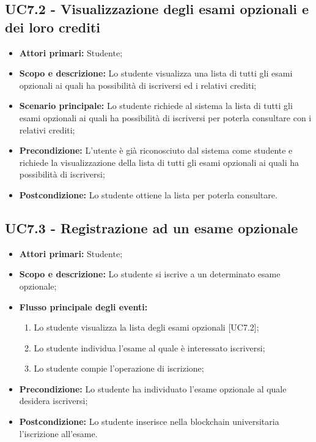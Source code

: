 \documentclass[AnalisiDeiRequisiti.tex]{subfiles}
\begin{document}
\subsection{UC7.2 - Visualizzazione degli esami opzionali e dei loro crediti}
\begin{itemize}
	\item \textbf{Attori primari:} Studente;\\
	\item \textbf{Scopo e descrizione:} Lo studente visualizza una lista di tutti gli esami opzionali ai quali ha possibilità di iscriversi ed i relativi crediti;\\
	\item \textbf{Scenario principale:} Lo studente richiede al sistema la lista di tutti gli esami opzionali ai quali ha possibilità di iscriversi per poterla consultare con i relativi crediti;\\
	\item \textbf{Precondizione:} L'utente è già riconosciuto dal sistema come studente e richiede la visualizzazione della lista di tutti gli esami opzionali ai quali ha possibilità di iscriversi;\\
	\item \textbf{Postcondizione:} Lo studente ottiene la lista per poterla consultare.\\
\end{itemize}

\subsection{UC7.3 - Registrazione ad un esame opzionale}
\begin{itemize}
	\item \textbf{Attori primari:} Studente;\\
	\item \textbf{Scopo e descrizione:} Lo studente si iscrive a un determinato esame opzionale;\\
	\item \textbf{Flusso principale degli eventi:}\\
	\begin{enumerate}
		\item Lo studente visualizza la lista degli esami opzionali [UC7.2];
		\item Lo studente individua l'esame al quale è interessato iscriversi;
		\item Lo studente compie l'operazione di iscrizione;
	\end{enumerate}
	\item \textbf{Precondizione:} Lo studente ha individuato l'esame opzionale al quale desidera iscriversi;\\
	\item \textbf{Postcondizione:} Lo studente inserisce nella blockchain universitaria l'iscrizione all'esame.\\
\end{itemize}
\end{document}
